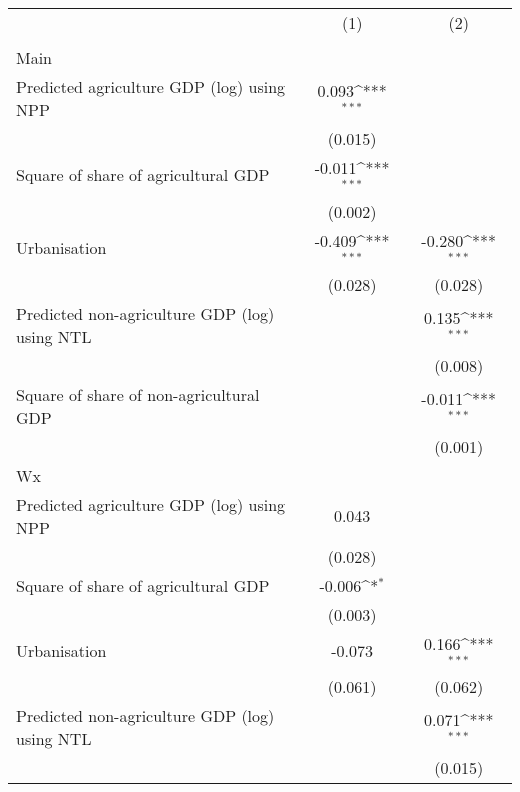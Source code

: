{
\def\sym#1{\ifmmode^{#1}\else\(^{#1}\)\fi}
\begin{tabular}{l*{2}{c}}
\hline\hline
                    &\multicolumn{1}{c}{(1)}&\multicolumn{1}{c}{(2)}\\
                    &\multicolumn{1}{c}{ }&\multicolumn{1}{c}{ }\\
\hline
Main                &                     &                     \\
Predicted agriculture GDP (log) using NPP&       0.093\sym{***}&                     \\
                    &     (0.015)         &                     \\
[1em]
Square of share of agricultural GDP&      -0.011\sym{***}&                     \\
                    &     (0.002)         &                     \\
[1em]
Urbanisation        &      -0.409\sym{***}&      -0.280\sym{***}\\
                    &     (0.028)         &     (0.028)         \\
[1em]
Predicted non-agriculture GDP (log) using NTL&                     &       0.135\sym{***}\\
                    &                     &     (0.008)         \\
[1em]
Square of share of non-agricultural GDP&                     &      -0.011\sym{***}\\
                    &                     &     (0.001)         \\
\hline
Wx                  &                     &                     \\
Predicted agriculture GDP (log) using NPP&       0.043         &                     \\
                    &     (0.028)         &                     \\
[1em]
Square of share of agricultural GDP&      -0.006\sym{*}  &                     \\
                    &     (0.003)         &                     \\
[1em]
Urbanisation        &      -0.073         &       0.166\sym{***}\\
                    &     (0.061)         &     (0.062)         \\
[1em]
Predicted non-agriculture GDP (log) using NTL&                     &       0.071\sym{***}\\
                    &                     &     (0.015)         \\

\end{tabular}}
